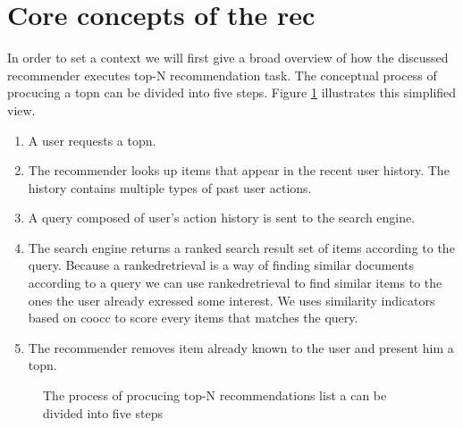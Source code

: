 \section{Core concepts of the \gls{rec}}
\label{sec:design}

In order to set a context we will first give a broad overview of how the discussed recommender executes top-N recommendation task.
The conceptual process of procucing a \gls{topn} can be divided into five steps. Figure \ref{fig:topndataflow} illustrates this simplified view.

\begin{enumerate}
\item A user requests a \gls{topn}.
\item The recommender looks up items that appear in the recent user history. The history contains multiple types of past user actions.
\item A query composed of user's action history is sent to the search engine.
\item The search engine returns a ranked search result set of items according to the query. Because a \gls{rankedretrieval} is a way of finding similar documents according to a query we can use \gls{rankedretrieval} to find similar items to the ones the user already exressed some interest.
 We uses similarity indicators based on \gls{coocc} to score every items that matches the query.
\item The recommender removes item already known to the user and present him a \gls{topn}.
\end{enumerate}


\begin{figure}
  \centering
  \caption{The process of procucing top-N recommendations list a can be divided into five steps}
  \label{fig:topndataflow}
\end{figure}

